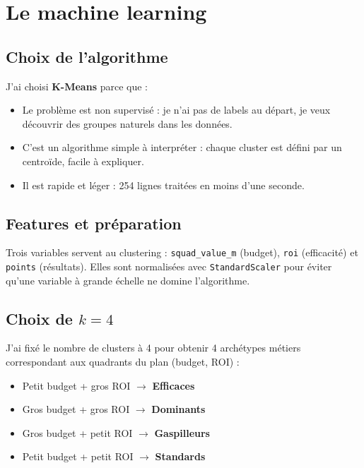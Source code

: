 \documentclass[11pt,a4paper]{article}
\begin{document}
\section{Le machine learning}

\subsection*{Choix de l'algorithme}

J'ai choisi \textbf{K-Means} parce que :

\begin{itemize}
  \item Le problème est non supervisé : je n'ai pas de labels au départ, je
        veux découvrir des groupes naturels dans les données.
  \item C'est un algorithme simple à interpréter : chaque cluster est défini
        par un centroïde, facile à expliquer.
  \item Il est rapide et léger : 254 lignes traitées en moins d'une seconde.
\end{itemize}

\subsection*{Features et préparation}

Trois variables servent au clustering :
\texttt{squad\_value\_m} (budget), \texttt{roi} (efficacité) et \texttt{points}
(résultats). Elles sont normalisées avec \texttt{StandardScaler} pour éviter
qu'une variable à grande échelle ne domine l'algorithme.

\subsection*{Choix de $k=4$}

J'ai fixé le nombre de clusters à 4 pour obtenir 4 archétypes métiers
correspondant aux quadrants du plan (budget, ROI) :

\begin{itemize}
  \item Petit budget + gros ROI $\to$ \textbf{Efficaces}
  \item Gros budget + gros ROI $\to$ \textbf{Dominants}
  \item Gros budget + petit ROI $\to$ \textbf{Gaspilleurs}
  \item Petit budget + petit ROI $\to$ \textbf{Standards}
\end{itemize}
\end{document}
